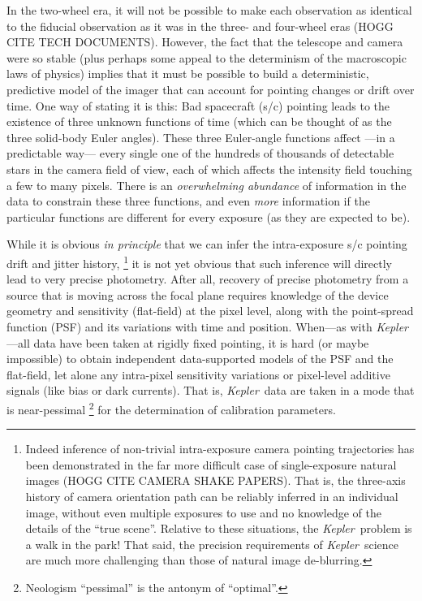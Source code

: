 \documentclass[letterpaper,12pt,preprint]{aastex}
\newcommand{\observatory}[1]{\textsl{#1}}
\newcommand{\Kepler}{\observatory{Kepler}}
\begin{document}
In the two-wheel era, it will not be possible
  to make each observation as identical to the fiducial observation
  as it was in the three- and four-wheel eras (HOGG CITE TECH DOCUMENTS).
However, the fact that the telescope and camera were so stable
  (plus perhaps some appeal to the determinism of the macroscopic laws of physics)
  implies that it must be possible to build a deterministic, predictive model
  of the imager that can account for pointing changes or drift over time.
One way of stating it is this:
Bad spacecraft (s/c) pointing leads to the existence of
  three unknown functions of time
  (which can be thought of as the three solid-body Euler angles).
These three Euler-angle functions affect%
  ---in a predictable way---%
  every single one of the hundreds of thousands of detectable stars
  in the camera field of view,
  each of which affects the intensity field touching a few to many pixels.
There is an \emph{overwhelming abundance} of information in the data
  to constrain these three functions,
  and even \emph{more} information if the particular functions
  are different for every exposure (as they are expected to be).

While it is obvious \emph{in principle} that we can infer
  the intra-exposure s/c pointing drift and jitter history,%
  \footnote{Indeed inference of non-trivial intra-exposure
    camera pointing trajectories has been demonstrated in the far more difficult
    case of single-exposure natural images (HOGG CITE CAMERA SHAKE PAPERS).
  That is, the three-axis history of camera orientation path
    can be reliably inferred in an individual image,
    without even multiple exposures to use
    and no knowledge of the details of the ``true scene''.
  Relative to these situations, the \Kepler\ problem is a walk in the park!
  That said, the precision requirements of \Kepler\ science
    are much more challenging than those of natural image de-blurring.}
  it is not yet obvious that such inference will directly lead to very precise photometry.
After all, recovery of precise photometry from a source
  that is moving across the focal plane
  requires knowledge of the device geometry and sensitivity
  (flat-field) at the pixel level,
  along with the point-spread function (PSF) and its variations with time and position.
When---as with \Kepler---all data have been taken at rigidly fixed pointing,
  it is hard (or maybe impossible) to obtain independent data-supported models of
  the PSF and the flat-field,
  let alone any intra-pixel sensitivity variations
  or pixel-level additive signals (like bias or dark currents).
That is, 
  \Kepler\ data are taken in a mode that is
  near-pessimal%
  \footnote{Neologism ``pessimal'' is the antonym of ``optimal''.}
  for the determination of calibration parameters.
\end{document}
